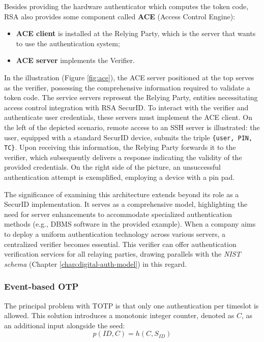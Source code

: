 Besides providing the hardware authenticator which computes the token code, 
RSA also provides some component called \textbf{ACE} (Access Control Engine):
\begin{itemize}
    \item \textbf{ACE client} is installed at the Relying Party, which is the server that wants to use the authentication system;
    \item \textbf{ACE server} implements the Verifier.
\end{itemize}
In the illustration (Figure \ref{fig:ace}), the ACE server positioned at the top serves as the verifier, possessing the comprehensive information required to validate a token code. The service servers represent the Relying Party, entities necessitating access control integration with RSA SecurID. To interact with the verifier and authenticate user credentials, these servers must implement the ACE client. On the left of the depicted scenario, remote access to an SSH server is illustrated: the user, equipped with a standard SecurID device, submits the triple \texttt{\{user, PIN, TC\}}. Upon receiving this information, the Relying Party forwards it to the verifier, which subsequently delivers a response indicating the validity of the provided credentials. On the right side of the picture, an unsuccessful authentication attempt is exemplified, employing a device with a pin pad.

The significance of examining this architecture extends beyond its role as a SecurID implementation. It serves as a comprehensive model, highlighting the need for server enhancements to accommodate specialized authentication methods (e.g., DBMS software in the provided example). When a company aims to deploy a uniform authentication technology across various servers, a centralized verifier becomes essential. This verifier can offer authentication verification services for all relaying parties, drawing parallels with the \textit{NIST schema} (Chapter \ref{chap:digital-auth-model}) in this regard.



\subsubsection{Event-based OTP}
The principal problem with TOTP is that only one authentication per timeslot is allowed. 
This solution introduces a monotonic integer counter, denoted as $C$, as an additional input alongside the seed: 
\[
p(ID, C) = h(C, S_{ID})
\]

